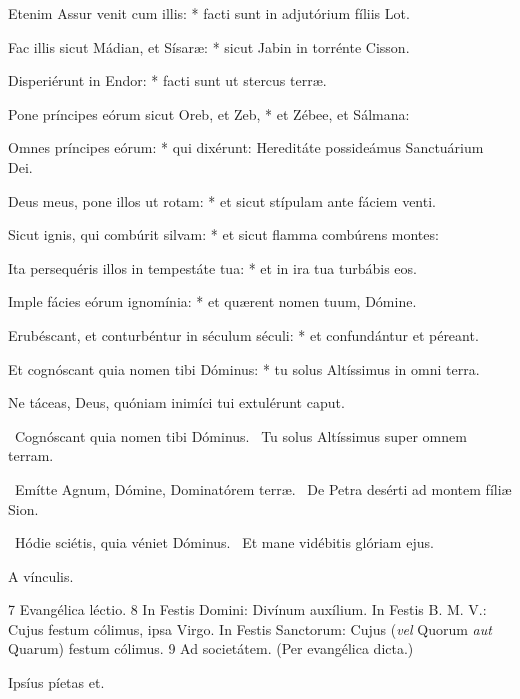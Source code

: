 Etenim Assur venit cum illis: * facti sunt in adjutórium fíliis Lot.

Fac illis sicut Mádian, et Sísaræ: * sicut Jabin in torrénte Cisson.

Disperiérunt in Endor: * facti sunt ut stercus terræ.

Pone príncipes eórum sicut Oreb, et Zeb, * et Zébee, et Sálmana:

Omnes príncipes eórum: * qui dixérunt: Hereditáte possideámus Sanctuárium Dei.

Deus meus, pone illos ut rotam: * et sicut stípulam ante fáciem venti.

Sicut ignis, qui combúrit silvam: * et sicut flamma combúrens montes:

Ita persequéris illos in tempestáte tua: * et in ira tua turbábis eos.

Imple fácies eórum ignomínia: * et quærent nomen tuum, Dómine.

Erubéscant, et conturbéntur in séculum séculi: * et confundántur et péreant.

Et cognóscant quia nomen tibi Dóminus: * tu solus Altíssimus in omni terra.

 Ne táceas, Deus, quóniam inimíci tui extulérunt caput.


\V\ Cognóscant quia nomen tibi Dóminus. \R\ Tu solus Altíssimus super omnem terram.


\V\ Emítte Agnum, Dómine, Dominatórem terræ. \R\ De Petra desérti ad montem fíliæ Sion.


\V\ Hódie sciétis, quia véniet Dóminus. \R\ Et mane vidébitis glóriam ejus.


 A vínculis.

 7 Evangélica léctio. 8 In Festis Domini: Divínum auxílium. In Festis B. M. V.: Cujus festum cólimus, ipsa Virgo. In Festis Sanctorum: Cujus (\textit{vel} Quorum \textit{aut} Quarum) festum cólimus. 9 Ad societátem. (Per evangélica dicta.)


 Ipsíus píetas et.

